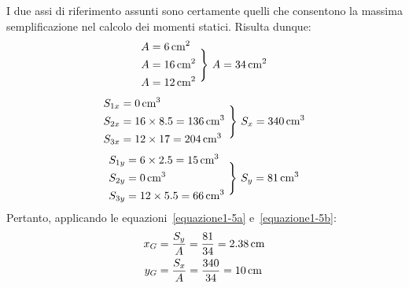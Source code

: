 \noindent I due assi di riferimento assunti sono certamente quelli che consentono la massima semplificazione nel calcolo dei momenti statici. Risulta dunque:
\begin{equation*}
\begin{aligned}
A &= 6\,\textup{cm}^2 \\
A &= 16\,\textup{cm}^2 \\
A &= 12\,\textup{cm}^2
\end{aligned}
\,\,\Biggr\}\,\, A = 34\,\textup{cm}^2
\end{equation*}
\begin{equation*}
\begin{aligned}
S_{1x} &= 0\,\textup{cm}^3 \\
S_{2x} &= 16\times 8.5 = 136\,\textup{cm}^3 \\
S_{3x} &= 12\times 17  = 204\,\textup{cm}^3
\end{aligned}
\,\,\Biggr\}\,\, S_x = 340\,\textup{cm}^3
\end{equation*}
\begin{equation*}
\begin{aligned}
S_{1y} &= 6\times 2.5 = 15\,\textup{cm}^3 \\
S_{2y} &= 0\,\textup{cm}^3 \\
S_{3y} &= 12\times 5.5  = 66\,\textup{cm}^3
\end{aligned}
\,\,\Biggr\}\,\, S_y = 81\,\textup{cm}^3
\end{equation*}
Pertanto, applicando le equazioni~\eqref{equazione1-5a} e~\eqref{equazione1-5b}:
\begin{align*} 
x_G    &= \frac{S_y}{A} = \frac{81}{34} = 2.38\,\textup{cm}  \\
y_G    &= \frac{S_x}{A} = \frac{340}{34} = 10\,\textup{cm}
\end{align*}
